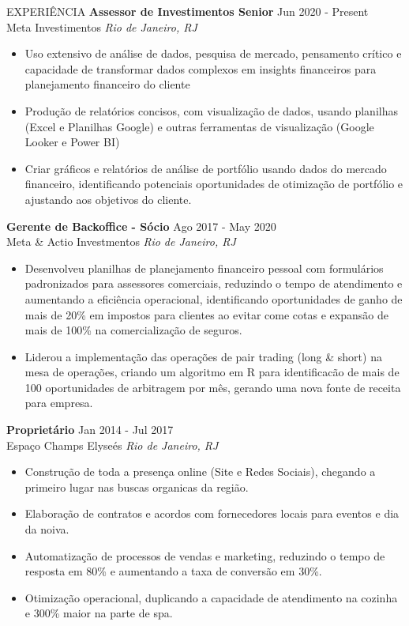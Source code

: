 \documentclass{resume} %
\begin{document}
\vspace{-1em}
\begin{rSection}{EXPERIÊNCIA}
\textbf{Assessor de Investimentos Senior} \hfill Jun 2020 - Present\\
Meta Investimentos \hfill \textit{Rio de Janeiro, RJ}
{\footnotesize
\begin{itemize}
    \itemsep -3pt {} 
     \item Uso extensivo de análise de dados, pesquisa de mercado, pensamento crítico e capacidade de transformar dados complexos em insights financeiros para planejamento financeiro do cliente
     \item Produção de relatórios concisos, com visualização de dados, usando planilhas (Excel e Planilhas Google) e outras ferramentas de visualização (Google Looker e Power BI)
     \item Criar gráficos e relatórios de análise de portfólio usando dados do mercado financeiro, identificando potenciais oportunidades de otimização de portfólio e ajustando aos objetivos do cliente.
 \end{itemize}
}
\textbf{Gerente de Backoffice - Sócio} \hfill Ago 2017 - May 2020\\
Meta \& Actio Investmentos \hfill \textit{Rio de Janeiro, RJ}
{\footnotesize
\begin{itemize}
    \itemsep -3pt {} 
    \item Desenvolveu planilhas de planejamento financeiro pessoal com formulários padronizados para assessores comerciais, reduzindo o tempo de atendimento e aumentando a eficiência operacional, identificando oportunidades de ganho de mais de 20\% em impostos para clientes ao evitar come cotas e expansão de mais de 100\% na comercialização de seguros.
    \item Liderou a implementação das operações de pair trading (long \& short) na mesa de operações, criando um algoritmo em R para identificacão de mais de 100 oportunidades de arbitragem por mês, gerando uma nova fonte de receita para empresa.
\end{itemize}
}
\textbf{Proprietário} \hfill Jan 2014 - Jul 2017\\
Espaço Champs Elyseés \hfill \textit{Rio de Janeiro, RJ}
{\footnotesize
\begin{itemize}
    \itemsep -3pt {} 
    \item Construção de toda a presença online (Site e Redes Sociais), chegando a primeiro lugar nas buscas organicas da região.
    \item Elaboração de contratos e acordos com fornecedores locais para eventos e dia da noiva.
    \item Automatização de processos de vendas e marketing, reduzindo o tempo de resposta em 80\% e aumentando a taxa de conversão em 30\%.
    \item Otimização operacional, duplicando a capacidade de atendimento na cozinha e 300\% maior na parte de spa.
\end{itemize}
}
\end{rSection} 
\end{document}
